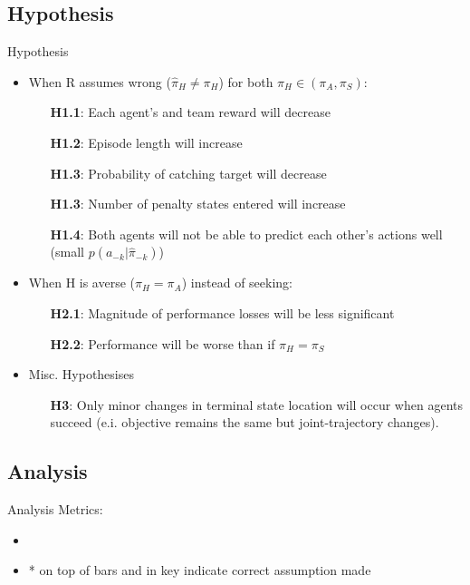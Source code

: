 \documentclass[aspectratio=1610, xcolor=dvipsnames]{packages/beamer}
\begin{document}
\subsection{Hypothesis}
\begin{frame}{Hypothesis}
    \begin{itemize}
        \item When R assumes wrong ($\hat{\pi}_H \neq \pi_H$) for both $\pi_H \in (\pi_A,\pi_S)$: %
        \begin{itemize}
            \item[\textbf{H1.1}:] Each agent's and team reward will decrease
            \item[\textbf{H1.2}:] Episode length will increase
            \item[\textbf{H1.3}:] Probability of catching target will decrease
            \item[\textbf{H1.3}:] Number of penalty states entered will increase
            \item[\textbf{H1.4}:] Both agents will not be able to predict each other's actions well (small  $p(a_{-k} | \hat{\pi}_{-k})$)
        \end{itemize}
    \item[]
    \item When H is averse ($\pi_H = \pi_A$) instead of seeking: %
        \begin{itemize}
            \item[\textbf{H2.1}:] Magnitude of performance losses will be less significant
            \item[\textbf{H2.2}:] Performance will be worse than if $\pi_H = \pi_S$
        \end{itemize}
    \item[]
    \item Misc. Hypothesises\begin{itemize}
        \item[\textbf{H3}:] Only minor changes in terminal state location will occur when agents succeed (e.i. objective remains the same but joint-trajectory changes).
    \end{itemize}
    \end{itemize}
\end{frame}


\subsection{Analysis}
\begin{frame}{Analysis}
    Metrics: \begin{itemize}
        \item
    \end{itemize}
    \begin{itemize}
        \item * on top of bars and in key indicate correct assumption made
    \end{itemize}
\end{frame}
\end{document}
